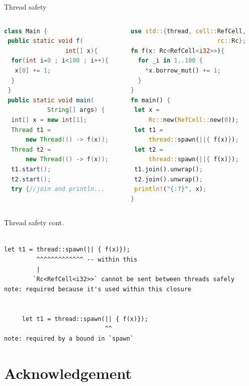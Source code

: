 \documentclass[10pt]{beamer}
\begin{document}
\begin{frame}[fragile]{Thread safety}
	\begin{columns}
        \begin{column}{0.5\textwidth}
            \begin{lstlisting}[language=java]
class Main {
 public static void f(
                 int[] x){
  for(int i=0 ; i<100 ; i++){
   x[0] += 1;
  }
 }
 public static void main(
            String[] args) {
  int[] x = new int[1];
  Thread t1 = 
      new Thread(() -> f(x));
  Thread t2 = 
      new Thread(() -> f(x));
  t1.start();
  t2.start();
  try {//join and println...


            \end{lstlisting}
        \end{column}
        
        \vrule{}
        \begin{column}{0.5\textwidth}
            \begin{lstlisting}[language=rust]
use std::{thread, cell::RefCell,
                        rc::Rc};
fn f(x: Rc<RefCell<i32>>){
  for _i in 1..100 {
    *x.borrow_mut() += 1;
  }
}
fn main() {
 let x = 
     Rc::new(RefCell::new(0));
 let t1 = 
     thread::spawn(||{ f(x)});
 let t2 = 
     thread::spawn(||{ f(x)});
 t1.join().unwrap();
 t2.join().unwrap();
 println!("{:?}", x);
}
            \end{lstlisting}
        
        \end{column}
    \end{columns}
\end{frame}

\begin{frame}[fragile]{Thread safety cont.}
\begin{verbatim}

let t1 = thread::spawn(|| { f(x)});
         ^^^^^^^^^^^^^ -- within this 
         |
        `Rc<RefCell<i32>>` cannot be sent between threads safely
note: required because it's used within this closure


     let t1 = thread::spawn(|| { f(x)});
                            ^^
note: required by a bound in `spawn`
\end{verbatim}  
\end{frame}

\section*{Acknowledgement}  
\end{document}
